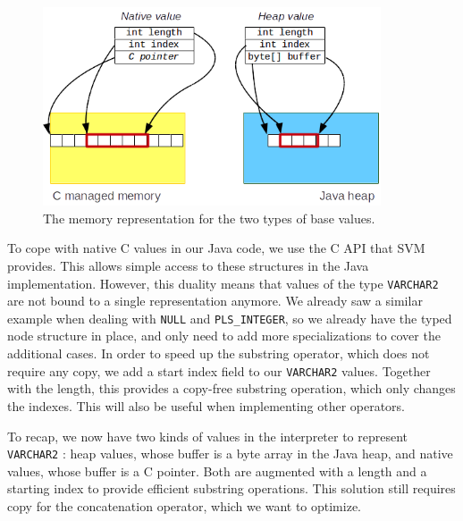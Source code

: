 \documentclass[twoside,11pt,a4paper]{article}
\newcommand{\java}[1]{\textsf{#1}}
\newcommand{\pls}[1]{\small\texttt{#1}\normalsize}
\newcommand{\plstype}[1]{\pls{#1}}
\newcommand{\varchar}{\plstype{VARCHAR2}}
\newcommand{\plsi}{\plstype{PLS\_INTEGER}}
\newcommand{\plsnull}{\pls{NULL}}
\begin{document}
\begin{figure}[bt]
	\centering
	\includegraphics[width=10cm]{./graphs/BaseValues.png}
	\caption{The memory representation for the two types of base values.}
\end{figure}

To cope with native C values in our Java code, we use the C API that SVM provides. This allows simple access to these structures in the Java implementation. However, this duality means that values of the type \varchar{} are not bound to a single representation anymore. We already saw a similar example when dealing with \plsnull{} and \plsi{}, so we already have the typed node structure in place, and only need to add more specializations to cover the additional cases. In order to speed up the substring operator, which does not require any copy, we add a start index field to our \varchar{} values. Together with the length, this provides a copy-free substring operation, which only changes the indexes. This will also be useful when implementing other operators.

To recap, we now have two kinds of values in the interpreter to represent \varchar{} : heap values, whose buffer is a \java{byte} array in the Java heap, and native values, whose buffer is a C pointer. Both are augmented with a length and a starting index to provide efficient substring operations. This solution still requires copy for the concatenation operator, which we want to optimize.

%
%
\end{document}
